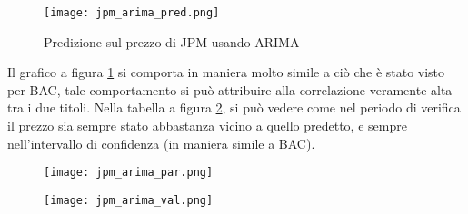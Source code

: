 \begin{figure}[ht]
    \centering
    \texttt{[image: jpm\_arima\_pred.png]}
    \caption{Predizione sul prezzo di JPM usando ARIMA}
    \label{fig:jpm_arima_pred}
\end{figure}

Il grafico a figura \ref{fig:jpm_arima_pred} si comporta in maniera molto simile a ciò che è stato visto per BAC, tale comportamento si può attribuire alla correlazione
veramente alta tra i due titoli. Nella tabella a figura \ref{fig:jpm_arima_val}, si può vedere come nel periodo di verifica il prezzo sia sempre stato abbastanza vicino a quello predetto, e sempre 
nell'intervallo di confidenza (in maniera simile a BAC).

\begin{figure}[ht]
    \centering
    \begin{minipage}{.5\textwidth}
        \centering
        \vspace{2.21cm}
        \texttt{[image: jpm\_arima\_par.png]}
        \label{fig:jpm_arima_param}
    \end{minipage}%
    \begin{minipage}{.5\textwidth}
        \centering
        \texttt{[image: jpm\_arima\_val.png]}
        \label{fig:jpm_arima_val}
    \end{minipage}
\end{figure}

\pagebreak